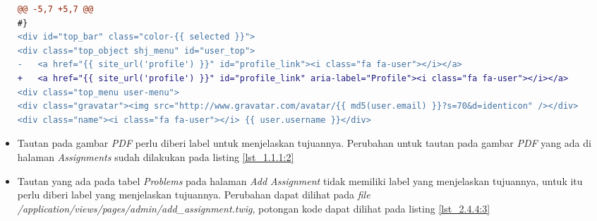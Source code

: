 \begin{itemize}
\begin{lstlisting}[language=diff, caption=Perubahan pada \textit{file} \textit{top\_bar.twig}, label=lst_2.4.4:2, basicstyle=\ttfamily, frame=single,
columns=fullflexible, keepspaces=true, breaklines=true]
@@ -5,7 +5,7 @@
#}
<div id="top_bar" class="color-{{ selected }}">
<div class="top_object shj_menu" id="user_top">
- 	<a href="{{ site_url('profile') }}" id="profile_link"><i class="fa fa-user"></i></a>
+ 	<a href="{{ site_url('profile') }}" id="profile_link" aria-label="Profile"><i class="fa fa-user"></i></a>
<div class="top_menu user-menu">
<div class="gravatar"><img src="http://www.gravatar.com/avatar/{{ md5(user.email) }}?s=70&d=identicon" /></div>
<div class="name"><i class="fa fa-user"></i> {{ user.username }}</div>
\end{lstlisting}

	\item Tautan pada gambar \textit{PDF} perlu diberi label untuk menjelaskan tujuannya. Perubahan untuk tautan pada gambar \textit{PDF} yang ada di halaman \textit{Assignments} sudah dilakukan pada listing \ref{lst_1.1.1:2}
	
	\item Tautan yang ada pada tabel \textit{Problems} pada halaman \textit{Add Assignment} tidak memiliki label yang menjelaskan tujuannya, untuk itu perlu diberi label yang menjelaskan tujuannya. Perubahan dapat dilihat pada \textit{file} \textit{/application/views/pages/admin/add\_assignment.twig}, potongan kode dapat dilihat pada listing \ref{lst_2.4.4:3}
	

\end{itemize}
